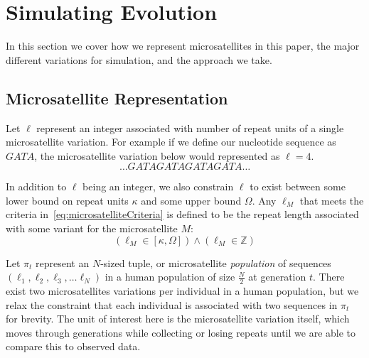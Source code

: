 \section{Simulating Evolution}\label{sec:se}
In this section we cover how we represent microsatellites in this paper, the major different variations for simulation,
and the approach we take.

\subsection{Microsatellite Representation}\label{subsec:mr}
Let $\ell$ represent an integer associated with number of repeat units of a single microsatellite variation.
For example if we define our nucleotide sequence as $GATA$, the microsatellite variation below would represented
as $\ell=4$.
\begin{equation*}
    \ldots \mathit{GATAGATAGATAGATA} \ldots
\end{equation*}

In addition to $\ell$ being an integer, we also constrain $\ell$ to exist between some lower bound on repeat units
$\kappa$ and some upper bound $\Omega$.
Any $\ell_M$ that meets the criteria in~\autoref{eq:microsatelliteCriteria} is defined to be the repeat length associated
with some variant for the microsatellite $M$:
\begin{equation}\label{eq:microsatelliteCriteria}
    \left(\ell_M \in [\kappa, \Omega]\right) \land \left(\ell_M \in \mathbb{Z}\right)
\end{equation}

Let $\pi_t$ represent an $N$-sized tuple, or microsatellite \emph{population} of sequences
$\left(\ell_1, \ell_2, \ell_3, \ldots \ell_{N}\right)$ in a human population of size $\frac{N}{2}$ at generation $t$.
There exist two microsatellites variations per individual in a human population, but we relax the constraint that
each individual is associated with two sequences in $\pi_t$ for brevity.
The unit of interest here is the microsatellite variation itself, which moves through generations while collecting or
losing repeats until we are able to compare this to observed data.


